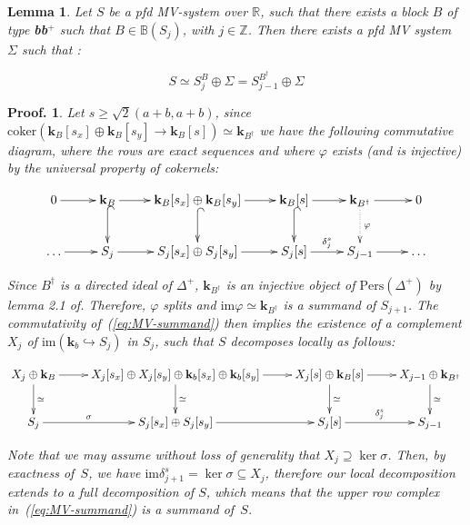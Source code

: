 \documentclass[a4paper, english, 11pt]{article}
\newcommand{\kk}[0]{\textbf{k}}
\newcommand{\Pe}{\text{Pers}}
\newcommand{\0}{\vec{0}}
\newcommand{\R}[0]{\mathbb{R}}
\newcommand{\Z}[0]{\mathbb{Z}}
\newtheorem*{pf}{Proof.} }
\newtheorem{lem}[prop]{Lemma}
\begin{document}
\begin{lem}
Let $S$ be a pfd MV-system over $\R$, such that there exists  a block $B$ of type \textbf{bb$^+$} such that $B\in\mathbb{B}(S_{j})$, with $j\in\Z$. Then there exists a pfd MV system $\Sigma$ such that : 

$$ S \simeq S_{j}^{B} \oplus \Sigma = S_{j-1}^{B^\dag} \oplus \Sigma  $$
\end{lem}

\begin{pf}
Let $s \geq \sqrt{2}(a+b,a+b)$, since $\text{coker}\left (\kk_B[s_x] \oplus \kk_B[s_y] \longrightarrow \kk_B[s] \right ) \simeq \kk_{B^\dag} $  we have the following commutative diagram, where the rows are exact sequences and where $\varphi$ exists (and is injective) by the universal property of cokernels: 
 
 \begin{equation}\label{eq:MV-summand}
 \begin{gathered}
 \xymatrix{0 \ar[r] & \kk_B \ar@{^{(}->}[d] \ar[r] &\kk_B[s_x] \oplus \kk_B[s_y] \ar[r] \ar@{^{(}->}[d] & \kk_B[s]\ar[r] \ar@{^{(}->}[d] & \kk_{B^\dag} \ar[r] \ar@{.>}[d]^\varphi  & 0 \\
\dots \ar[r] & S_j \ar[r] & S_j[s_x] \oplus S_j[s_y] \ar[r] & S_j[s] \ar[r]^{\delta_j^s} & S_{j-1} \ar[r]& \dots  }
\end{gathered}
\end{equation}
 
Since $B^\dag$ is a directed ideal of $\Delta^+$, $\kk_{B^\dag}$ is an injective object of $\Pe(\Delta^+)$ by lemma 2.1 of\cite{BotCra18}. Therefore, $\varphi$ splits and $\text{im} \varphi \simeq \kk_{B^\dag}$ is a summand of $S_{j+1}$.  The commutativity of~(\ref{eq:MV-summand}) then implies the existence of a complement $X_j$ of $\text{im} (\kk_b\hookrightarrow S_j)$ in $S_j$, such that $S$ decomposes locally as follows:

$$
\xymatrix{X_j \oplus \kk_B \ar^-{\simeq}[d]\ar[r] &X_j[s_x] \oplus X_j[s_y] \oplus  \kk_b[s_x] \oplus \kk_b[s_y] \ar^-{\simeq}[d]\ar[r] & X_j[s] \oplus \kk_B[s] \ar^-{\simeq}[d] \ar[r]  & X_{j-1} \oplus \kk_{B^\dag} \ar^-{\simeq}[d]\\
S_j \ar^-{\sigma}[r] & S_j[s_x] \oplus S_j[s_y] \ar[r] & S_j[s] \ar[r]^{\delta_j^s} & S_{j-1}
}$$

Note that we may assume without loss of generality that $X_j \supseteq \ker \sigma$.
Then, by exactness of~$S$, we have $\text{im} \delta_{j+1}^s = \ker \sigma\subseteq X_j$, therefore our local decomposition extends to a full decomposition of $S$, which means that the upper row complex in~(\ref{eq:MV-summand}) is a summand of~$S$.
\end{pf}
\end{document}
